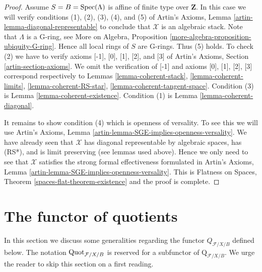 \begin{proof}
\medskip\noindent
Assume $S = B = \mathop{\mathrm{Spec}}(\Lambda)$ is affine of finite type over $\mathbf{Z}$.
In this case we will verify conditions (1), (2), (3), (4), and (5) of
Artin's Axioms, Lemma \ref{artin-lemma-diagonal-representable}
to conclude that $\mathcal{X}$ is an algebraic stack.
Note that $\Lambda$ is a G-ring, see
More on Algebra, Proposition \ref{more-algebra-proposition-ubiquity-G-ring}.
Hence all local rings of $S$ are G-rings. Thus (5) holds.
To check (2) we have to verify axioms [-1], [0], [1], [2], and [3]
of Artin's Axioms, Section \ref{artin-section-axioms}.
We omit the verification of [-1] and axioms
[0], [1], [2], [3] correspond respectively to
Lemmas \ref{lemma-coherent-stack},
\ref{lemma-coherent-limits},
\ref{lemma-coherent-RS-star},
\ref{lemma-coherent-tangent-space}.
Condition (3) is Lemma \ref{lemma-coherent-existence}.
Condition (1) is Lemma \ref{lemma-coherent-diagonal}.

\medskip\noindent
It remains to show condition (4) which is openness of versality.
To see this we will use
Artin's Axioms, Lemma \ref{artin-lemma-SGE-implies-openness-versality}.
We have already seen that $\mathcal{X}$ has diagonal
representable by algebraic spaces, has (RS*), and is limit preserving
(see lemmas used above).
Hence we only need to see that $\mathcal{X}$ satisfies the strong
formal effectiveness formulated in
Artin's Axioms, Lemma \ref{artin-lemma-SGE-implies-openness-versality}.
This is Flatness on Spaces, Theorem \ref{spaces-flat-theorem-existence}
and the proof is complete.
\end{proof}









\section{The functor of quotients}
\label{section-functor-quotients}

\noindent
In this section we discuss some generalities regarding the functor
$Q_{\mathcal{F}/X/B}$ defined below.
The notation $\mathrm{Quot}_{\mathcal{F}/X/B}$ is reserved for a
subfunctor of $\text{Q}_{\mathcal{F}/X/B}$.
We urge the reader to skip this section on a first reading.

